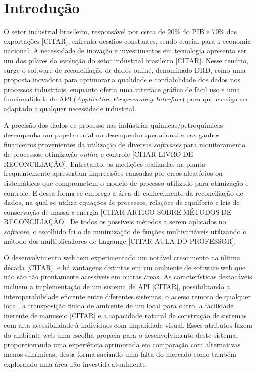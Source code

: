 \chapter{Introdução}
O setor industrial brasileiro, responsável por cerca de 20\% do PIB e 70\% das exportações [CITAR], enfrenta desafios constantes, sendo crucial para a economia nacional. A necessidade de inovação e investimentos em tecnologia apresenta ser um dos pilares da evolução do setor industrial brasileiro [CITAR]. Nesse cenário, surge o software de reconciliação de dados online, denominado DRD, como uma proposta inovadora para aprimorar a qualidade e confiabilidade dos dados nos processos industriais, enquanto oferta uma interface gráfica de fácil uso e uma funcionalidade de API (\textit{Application Programming Interface}) para que consiga ser adaptado a qualquer necessidade industrial.


A precisão dos dados de processo nas indústrias químicas/petroquímicas desempenha um papel crucial no desempenho operacional e nos ganhos financeiros provenientes da utilização de diversos \textit{softwares} para monitoramento de processos, otimização \textit{online} e controle [CITAR LIVRO DE RECONCILIAÇÃO]. Entretanto, as medições realizadas na planta frequentemente apresentam imprecisões causadas por erros aleatórios ou sistemáticos que comprometem o modelo de processo utilizado para otimização e controle. E dessa forma se emprega a área de conhecimento da reconciliação de dados, na qual se utiliza equações de processos, relações de equilíbrio e leis de conservação de massa e energia [CITAR ARTIGO SOBRE MÉTODOS DE RECONCILIAÇÃO]. De todos os possíveis métodos a serem aplicados no \textit{software}, o escolhido foi o de minimização de funções multivariáveis utilizando o método dos multiplicadores de Lagrange [CITAR AULA DO PROFESSOR]. 


O desenvolvimento web tem experimentado um notável crescimento na última década [CITAR], e há vantagens distintas em um ambiente de software web que não são tão prontamente acessíveis em outras áreas. As características destacáveis incluem a implementação de um sistema de API [CITAR], possibilitando a interoperabilidade eficiente entre diferentes sistemas, o acesso remoto de qualquer local, a transposição fluida de ambiente de um local para outro, a facilidade inerente de manuseio [CITAR] e a capacidade natural de construção de sistemas com alta acessibilidade à indivíduos com imparidade visual. Esses atributos fazem do ambiente web uma escolha propícia para o desenvolvimento deste sistema, proporcionando uma experiência aprimorada em comparação com alternativas menos dinâmicas, desta forma saciando uma falta do mercado como também explorando uma área não investida atualmente.

